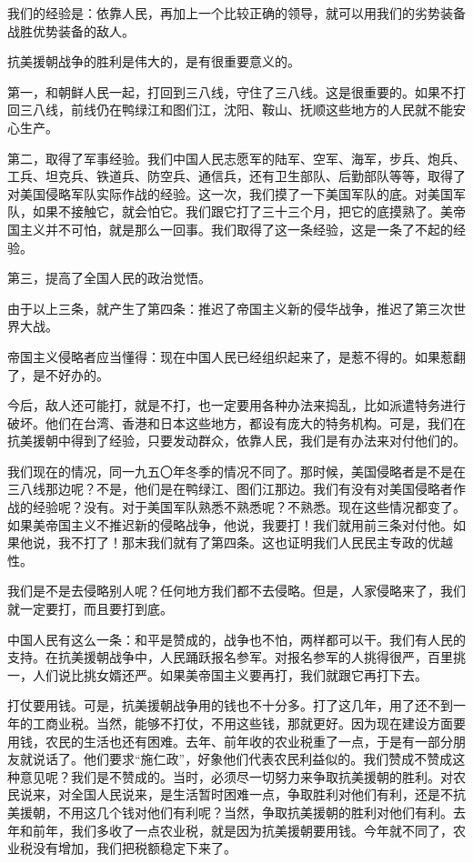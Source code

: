 我们的经验是：依靠人民，再加上一个比较正确的领导，就可以用我们的劣势装备战胜优势装备的敌人。

抗美援朝战争的胜利是伟大的，是有很重要意义的。

第一，和朝鲜人民一起，打回到三八线，守住了三八线。这是很重要的。如果不打回三八线，前线仍在鸭绿江和图们江，沈阳、鞍山、抚顺这些地方的人民就不能安心生产。

第二，取得了军事经验。我们中国人民志愿军的陆军、空军、海军，步兵、炮兵、工兵、坦克兵、铁道兵、防空兵、通信兵，还有卫生部队、后勤部队等等，取得了对美国侵略军队实际作战的经验。这一次，我们摸了一下美国军队的底。对美国军队，如果不接触它，就会怕它。我们跟它打了三十三个月，把它的底摸熟了。美帝国主义并不可怕，就是那么一回事。我们取得了这一条经验，这是一条了不起的经验。

第三，提高了全国人民的政治觉悟。

由于以上三条，就产生了第四条：推迟了帝国主义新的侵华战争，推迟了第三次世界大战。

帝国主义侵略者应当懂得：现在中国人民已经组织起来了，是惹不得的。如果惹翻了，是不好办的。

今后，敌人还可能打，就是不打，也一定要用各种办法来捣乱，比如派遣特务进行破坏。他们在台湾、香港和日本这些地方，都设有庞大的特务机构。可是，我们在抗美援朝中得到了经验，只要发动群众，依靠人民，我们是有办法来对付他们的。

我们现在的情况，同一九五〇年冬季的情况不同了。那时候，美国侵略者是不是在三八线那边呢？不是，他们是在鸭绿江、图们江那边。我们有没有对美国侵略者作战的经验呢？没有。对于美国军队熟悉不熟悉呢？不熟悉。现在这些情况都变了。如果美帝国主义不推迟新的侵略战争，他说，我要打！我们就用前三条对付他。如果他说，我不打了！那末我们就有了第四条。这也证明我们人民民主专政的优越性。

我们是不是去侵略别人呢？任何地方我们都不去侵略。但是，人家侵略来了，我们就一定要打，而且要打到底。

中国人民有这么一条：和平是赞成的，战争也不怕，两样都可以干。我们有人民的支持。在抗美援朝战争中，人民踊跃报名参军。对报名参军的人挑得很严，百里挑一，人们说比挑女婿还严。如果美帝国主义要再打，我们就跟它再打下去。

打仗要用钱。可是，抗美援朝战争用的钱也不十分多。打了这几年，用了还不到一年的工商业税。当然，能够不打仗，不用这些钱，那就更好。因为现在建设方面要用钱，农民的生活也还有困难。去年、前年收的农业税重了一点，于是有一部分朋友就说话了。他们要求“施仁政”，好象他们代表农民利益似的。我们赞成不赞成这种意见呢？我们是不赞成的。当时，必须尽一切努力来争取抗美援朝的胜利。对农民说来，对全国人民说来，是生活暂时困难一点，争取胜利对他们有利，还是不抗美援朝，不用这几个钱对他们有利呢？当然，争取抗美援朝的胜利对他们有利。去年和前年，我们多收了一点农业税，就是因为抗美援朝要用钱。今年就不同了，农业税没有增加，我们把税额稳定下来了。

